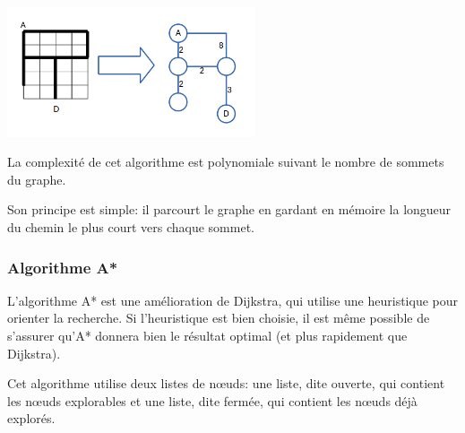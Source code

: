     \begin{center}
      \includegraphics[width=0.55\textwidth]{../slides/jeux/GRO_graph1.png}
    \end{center}

    La complexité de cet algorithme est polynomiale suivant le nombre de sommets
    du graphe.

    Son principe est simple: il parcourt le graphe en gardant en mémoire la
    longueur du chemin le plus court vers chaque sommet.

  \subsubsection{Algorithme A*}
    L'algorithme A* est une amélioration de Dijkstra, qui utilise une heuristique
    pour orienter la recherche.
    Si l'heuristique est bien choisie, il est même possible de s'assurer qu'A*
    donnera bien le résultat optimal (et plus rapidement que Dijkstra).

    Cet algorithme utilise deux listes de nœuds: une liste, dite ouverte, qui
    contient les nœuds explorables et une liste, dite fermée, qui contient les
    nœuds déjà explorés.


